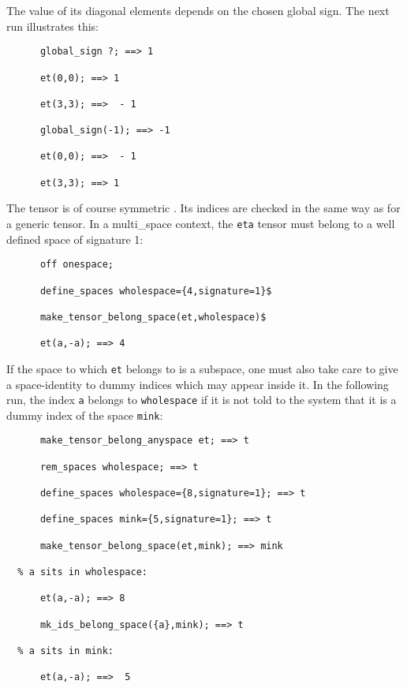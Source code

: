 The value of its diagonal elements depends on the chosen
global sign. The next run illustrates this:
\begin{verbatim}
      global_sign ?; ==> 1

      et(0,0); ==> 1

      et(3,3); ==>  - 1

      global_sign(-1); ==> -1

      et(0,0); ==>  - 1

      et(3,3); ==> 1
\end{verbatim}
The tensor is of course symmetric .  
Its indices are checked in the same way as for a generic tensor.
In a multi\_space context, the \texttt{eta} tensor must belong 
to a well defined space of signature 1:
\begin{verbatim}
      off onespace;

      define_spaces wholespace={4,signature=1}$  

      make_tensor_belong_space(et,wholespace)$

      et(a,-a); ==> 4
\end{verbatim}
If the space to which \texttt{et} belongs to is a subspace,
one must also
take care to give a space-identity to dummy indices which may appear inside 
it. In the following run, the index \texttt{a} belongs to \texttt{wholespace} 
if it is not told to the system that it is a dummy 
index of the space \texttt{mink}:
\begin{verbatim}
      make_tensor_belong_anyspace et; ==> t

      rem_spaces wholespace; ==> t

      define_spaces wholespace={8,signature=1}; ==> t

      define_spaces mink={5,signature=1}; ==> t

      make_tensor_belong_space(et,mink); ==> mink

  % a sits in wholespace:
   
      et(a,-a); ==> 8

      mk_ids_belong_space({a},mink); ==> t

  % a sits in mink:

      et(a,-a); ==>  5    
\end{verbatim}

